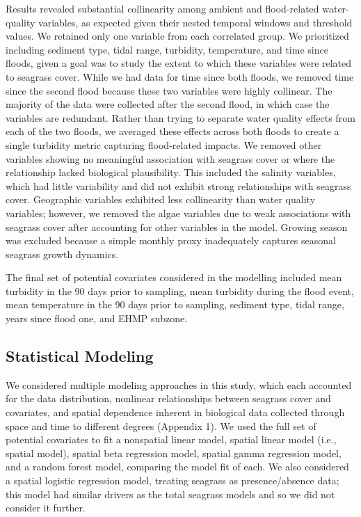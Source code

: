 \documentclass[
  letterpaper,
  DIV=11,
  numbers=noendperiod]{scrartcl}
\begin{document}
Results revealed substantial collinearity among ambient and
flood-related water-quality variables, as expected given their nested
temporal windows and threshold values. We retained only one variable
from each correlated group. We prioritized including sediment type,
tidal range, turbidity, temperature, and time since floods, given a goal
was to study the extent to which these variables were related to
seagrass cover. While we had data for time since both floods, we removed
time since the second flood because these two variables were highly
collinear. The majority of the data were collected after the second
flood, in which case the variables are redundant. Rather than trying to
separate water quality effects from each of the two floods, we averaged
these effects across both floods to create a single turbidity metric
capturing flood-related impacts. We removed other variables showing no
meaningful association with seagrass cover or where the relationship
lacked biological plausibility. This included the salinity variables,
which had little variability and did not exhibit strong relationships
with seagrass cover. Geographic variables exhibited less collinearity
than water quality variables; however, we removed the algae variables
due to weak associations with seagrass cover after accounting for other
variables in the model. Growing season was excluded because a simple
monthly proxy inadequately captures seasonal seagrass growth dynamics.

The final set of potential covariates considered in the modelling
included mean turbidity in the 90 days prior to sampling, mean turbidity
during the flood event, mean temperature in the 90 days prior to
sampling, sediment type, tidal range, years since flood one, and EHMP
subzone.

\subsection{Statistical Modeling}\label{sec-wb_model}

We considered multiple modeling approaches in this study, which each
accounted for the data distribution, nonlinear relationships between
seagrass cover and covariates, and spatial dependence inherent in
biological data collected through space and time to different degrees
(Appendix 1). We used the full set of potential covariates to fit a
nonspatial linear model, spatial linear model (i.e., spatial model),
spatial beta regression model, spatial gamma regression model, and a
random forest model, comparing the model fit of each. We also considered
a spatial logistic regression model, treating seagrass as
presence/absence data; this model had similar drivers as the total
seagrass models and so we did not consider it further.
\end{document}

